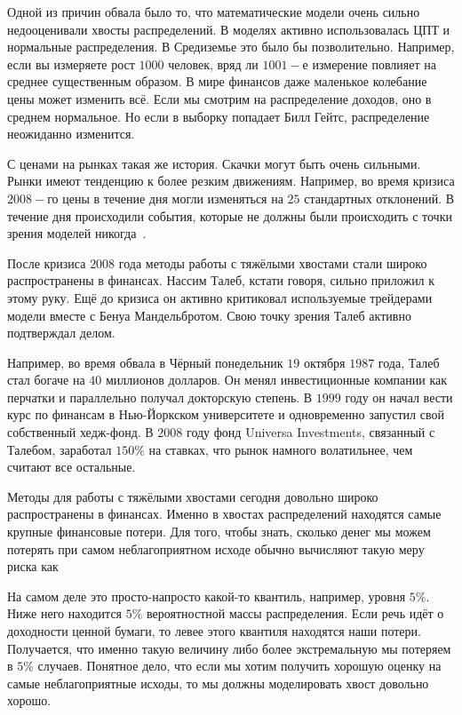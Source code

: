 \documentclass[12pt, a4paper, oneside]{article}
\begin{document}
Одной из причин обвала было то, что математические модели очень сильно недооценивали хвосты распределений. В моделях активно использовалась ЦПТ и нормальные распределения. В Средиземье это было бы позволительно. Например, если вы измеряете рост $1000$ человек, вряд ли $1001-$е измерение повлияет на среднее существенным образом. В мире финансов даже маленькое колебание цены может изменить всё. Если мы смотрим на распределение доходов, оно в среднем нормальное. Но если в выборку попадает Билл Гейтс, распределение неожиданно изменится. 

С ценами на рынках такая же история. Скачки могут быть очень сильными. Рынки имеют тенденцию к более резким движениям. Например, во время кризиса $2008-$го цены в течение дня могли изменяться на $25$ стандартных отклонений. В течение дня происходили события, которые не должны были происходить с точки зрения моделей никогда~\cite{ref:quant}. 


После кризиса $2008$ года методы работы с тяжёлыми хвостами стали широко распространены в финансах. Нассим Талеб, кстати говоря, сильно приложил к этому руку. Ещё до кризиса он активно критиковал используемые трейдерами модели вместе с Бенуа Мандельбротом. Свою точку зрения Талеб активно подтверждал делом.

Например, во время обвала в Чёрный понедельник $19$ октября $1987$ года, Талеб стал богаче на $40$ миллионов долларов. Он менял инвестиционные компании как перчатки и параллельно получал докторскую степень. В $1999$ году он начал вести курс по финансам в Нью-Йоркском университете и одновременно запустил свой собственный хедж-фонд.  В $2008$ году  фонд Universa Investments, связанный с Талебом, заработал $150\%$ на ставках, что рынок намного волатильнее, чем считают все остальные.  

Методы для работы с тяжёлыми хвостами сегодня довольно широко распространены в финансах. Именно в хвостах распределений находятся самые крупные финансовые потери. Для того, чтобы знать, сколько денег мы можем потерять при самом неблагоприятном исходе обычно вычисляют такую меру риска как 

На самом деле это просто-напросто какой-то квантиль, например, уровня $5 \%.$ Ниже него находится $5\%$ вероятностной массы распределения. Если речь идёт о доходности ценной бумаги, то левее этого квантиля находятся наши потери. Получается, что именно такую величину либо более экстремальную мы потеряем в $5\%$ случаев. Понятное дело, что если мы хотим получить хорошую оценку на самые неблагоприятные исходы, то мы должны моделировать хвост довольно хорошо.
\end{document}

